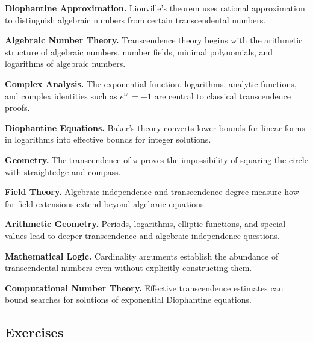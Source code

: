 \begin{applicationbox}
\textbf{Diophantine Approximation.}
Liouville's theorem uses rational approximation to distinguish algebraic
numbers from certain transcendental numbers.

\medskip

\textbf{Algebraic Number Theory.}
Transcendence theory begins with the arithmetic structure of algebraic
numbers, number fields, minimal polynomials, and logarithms of algebraic
numbers.

\medskip

\textbf{Complex Analysis.}
The exponential function, logarithms, analytic functions, and complex
identities such as \(e^{i\pi}=-1\) are central to classical transcendence
proofs.

\medskip

\textbf{Diophantine Equations.}
Baker's theory converts lower bounds for linear forms in logarithms into
effective bounds for integer solutions.

\medskip

\textbf{Geometry.}
The transcendence of \(\pi\) proves the impossibility of squaring the circle
with straightedge and compass.

\medskip

\textbf{Field Theory.}
Algebraic independence and transcendence degree measure how far field
extensions extend beyond algebraic equations.

\medskip

\textbf{Arithmetic Geometry.}
Periods, logarithms, elliptic functions, and special values lead to deeper
transcendence and algebraic-independence questions.

\medskip

\textbf{Mathematical Logic.}
Cardinality arguments establish the abundance of transcendental numbers even
without explicitly constructing them.

\medskip

\textbf{Computational Number Theory.}
Effective transcendence estimates can bound searches for solutions of
exponential Diophantine equations.
\end{applicationbox}

\subsection{Exercises}
\label{subsec:transcendental-number-theory-exercises}

